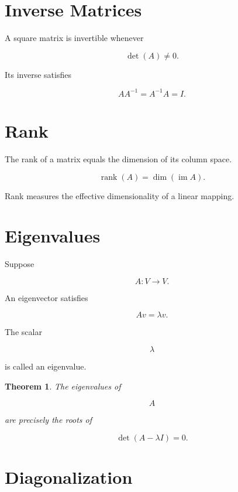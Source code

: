 \documentclass[11pt,fleqn]{book}
\numberwithin{equation}{chapter}
\theoremstyle{plain}
\newtheorem{theorem}{Theorem}[chapter]
\theoremstyle{definition}
\theoremstyle{remark}
\begin{document}
\section{Inverse Matrices}

A square matrix is invertible whenever

\[
\det(A)\neq0.
\]

Its inverse satisfies

\[
AA^{-1}
=
A^{-1}A
=
I.
\]


\section{Rank}

The rank of a matrix equals the dimension of its column space.

\[
\operatorname{rank}(A)
=
\dim(\operatorname{im}A).
\]

Rank measures the effective dimensionality of a linear mapping.


\section{Eigenvalues}

Suppose

\[
A:V\rightarrow V.
\]

An eigenvector satisfies

\[
Av
=
\lambda v.
\]

The scalar

\[
\lambda
\]

is called an eigenvalue.


\begin{theorem}

The eigenvalues of

\[
A
\]

are precisely the roots of

\[
\det(A-\lambda I)=0.
\]

\end{theorem}


\section{Diagonalization}
\end{document}
